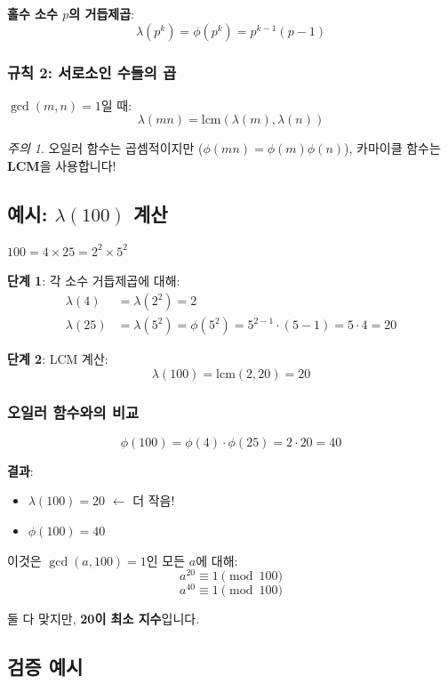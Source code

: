 \documentclass[11pt,a4paper]{article}
\theoremstyle{definition}
\theoremstyle{remark}
\newtheorem*{remark}{주의}
\begin{document}
\textbf{홀수 소수 $p$의 거듭제곱}:
\[\lambda(p^k) = \phi(p^k) = p^{k-1}(p-1)\]

\subsubsection{규칙 2: 서로소인 수들의 곱}

$\gcd(m,n) = 1$일 때:
\[\lambda(mn) = \text{lcm}(\lambda(m), \lambda(n))\]

\begin{remark}
오일러 함수는 곱셈적이지만 ($\phi(mn) = \phi(m)\phi(n)$), 카마이클 함수는 \textbf{LCM}을 사용합니다!
\end{remark}

\subsection{예시: $\lambda(100)$ 계산}

$100 = 4 \times 25 = 2^2 \times 5^2$

\textbf{단계 1}: 각 소수 거듭제곱에 대해:
\begin{align*}
\lambda(4) &= \lambda(2^2) = 2 \\
\lambda(25) &= \lambda(5^2) = \phi(5^2) = 5^{2-1} \cdot (5-1) = 5 \cdot 4 = 20
\end{align*}

\textbf{단계 2}: LCM 계산:
\[\lambda(100) = \text{lcm}(2, 20) = 20\]

\subsubsection{오일러 함수와의 비교}

\[\phi(100) = \phi(4) \cdot \phi(25) = 2 \cdot 20 = 40\]

\textbf{결과}:
\begin{itemize}
    \item $\lambda(100) = 20$ $\leftarrow$ 더 작음!
    \item $\phi(100) = 40$
\end{itemize}

이것은 $\gcd(a, 100) = 1$인 모든 $a$에 대해:
\[a^{20} \equiv 1 \pmod{100}\]
\[a^{40} \equiv 1 \pmod{100}\]

둘 다 맞지만, \textbf{20이 최소 지수}입니다.

\subsection{검증 예시}
\end{document}
